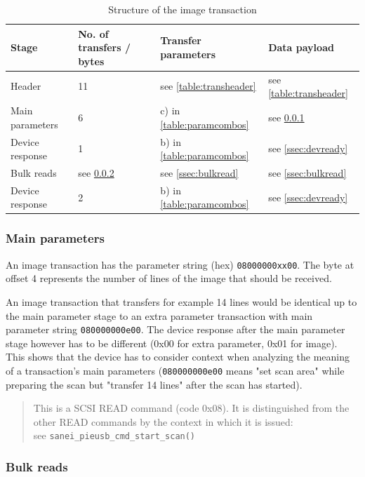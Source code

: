 \documentclass{article}
\begin{document}
\begin{table}[H]
  \caption{Structure of the image transaction}
  \centering
  \begin{tabular}{p{3cm} | p{1.5cm} | p{3cm} | p{3cm}}
    Stage & No. of transfers / bytes & Transfer parameters & Data payload \\ \hline
    
    Header & 11 & see \autoref{table:transheader} & see \autoref{table:transheader} \\
    Main parameters & 6 & c) in \autoref{table:paramcombos} & see \ref{ssec:image_param} \\
    Device response & 1 & b) in \autoref{table:paramcombos} & see \ref{ssec:devready} \\
    Bulk reads & see \ref{ssec:image_bulk} & see \ref{ssec:bulkread} & see \ref{ssec:bulkread} \\
    Device response & 2 & b) in \autoref{table:paramcombos} & see \ref{ssec:devready} \\
  \end{tabular}
\end{table}

\subsubsection{Main parameters}
\label{ssec:image_param}

An image transaction has the parameter string (hex) {\tt 08000000xx00}.
The byte at offset 4 represents the number of lines of the image that
should be received.

An image transaction that transfers for example 14 lines would be identical
up to the main parameter stage
to an extra parameter transaction with main parameter string {\tt 080000000e00}.
The device response after the main parameter stage however has to be different
(0x00 for extra parameter, 0x01 for image). This shows that the device has
to consider context when analyzing the meaning of a transaction's main parameters
({\tt 080000000e00} means "set scan area" while preparing the scan but
"transfer 14 lines" after the scan has started).



\blockquote[{\cite[\texttt{pieusb\_scancmd.c}]{sane_code}}]
{This is a SCSI READ command (code 0x08).
 It is distinguished from the other READ commands by the context
 in which it is issued: \\ see \texttt{sanei\_pieusb\_cmd\_start\_scan()}}

\subsubsection{Bulk reads}
\label{ssec:image_bulk}
\end{document}
